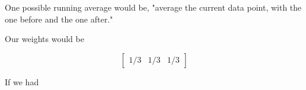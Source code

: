             \miniex One possible running average would be, "average the current data point, with the one before and the one after."
            
            Our weights would be
            
            \begin{equation}
                \begin{bmatrix}
                    1/3 & 1/3 & 1/3
                \end{bmatrix}
            \end{equation}
            
            If we had 
            
            
            
            
        \subsecdiv